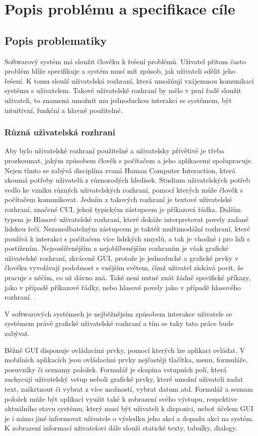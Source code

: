 \chapter{Popis problému a specifikace cíle}
\section{Popis problematiky}

Softwarový systém má sloužit člověku k řešení problémů. Uživatel přitom často problém blíže specifikuje a systém musí mít způsob, jak uživateli sdělit jeho řešení. K tomu slouží uživatelská rozhraní, která umožňují vzájemnou komunikaci systému s uživatelem. Takové uživatelské rozhraní by mělo v prní řadě sloužit uživateli, to znamená umožnit mu jednoduchou interakci se systémem, být intuitivní, funkční a hlavně použitelné. 


\subsection{Různá uživatelská rozhraní}
Aby bylo uživatelské rozhraní použitelné a uživatelsky přívětivé je třeba prozkoumat, jakým způsobem člověk s počítačem a jeho aplikacemi spolupracuje. Nejen tímto se zabývá disciplína zvaná Human Computer Interaction, která zkoumá potřeby uživatelů z různorodých hledisek. Studium uživatelských potřeb vedlo ke vzniku různých uživatelských rozhraní, pomocí kterých může člověk s počítačem komunikovat. Jedním z takových rozhraní je textové uživatelské rozhraní, značené CUI, jehož typickým zástupcem je příkazová řádka. Dalším typem je Hlasové uživatelské rozhraní, které dokáže interpretovat povely zadané lidskou řečí.  Nezanedbatelným zástupcem je taktéž multimodální rozhraní, které používá k interakci s počítačem více lidských smyslů, a tak je vhodné i pro lidi s postižením. Nejrozšířenějším a nejoblíbenějším rozhraním je však grafické uživatelské rozhraní, zkráceně GUI, protože je jednoduché a grafické prvky v člověku vyvolávají podobnost s vnějším světem, čímž uživatel získává pocit, že pracuje s něčím, co už dávno zná. Také není nutné znát žádně specifické příkazy, jako v případě příkazové řádky, nebo hlasové povely jako v případě hlasového rozhraní. \cite{uiTypes}. 

V softwarových systémech je nejběžnějsím způsobem interakce uživatele se systémem právě grafické uživatelské rozhraní a tím se taky tato práce bude zabývat. 

Běžně GUI disponuje ovládacími prvky, pomocí kterých lze aplikaci ovládat. V mobilních aplikacích jsou ovládacími prvky nejčastěji tlačítka, menu, formuláře, posuvníky či seznamy položek. Formulář je skupina vstupních polí, která zachycují uživatelský vstup neboli grafické prvky, které umožní uživateli zadat text, zaškrtnout či vybrat z více možností, vybrat datum atd. Formulář a seznam položek může být aplikací využit také k zobrazení svého výstupu, respektive aktuálního stavu systému, který musí být uživateli k dispozici, neboť účelem GUI je i mimo jiné informovat uživatele o výsledku jeho akcí a dopadu akcí na systém. K zobrazení informací uživatelovi dále slouží statické texty, tabulky, dialogy. 

